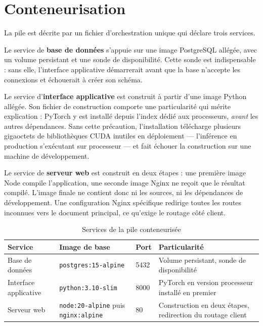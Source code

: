 \section{Conteneurisation}

La pile est décrite par un fichier d'orchestration unique qui déclare trois services.

Le service de \textbf{base de données} s'appuie sur une image PostgreSQL allégée, avec
un volume persistant et une sonde de disponibilité. Cette sonde est indispensable :
sans elle, l'interface applicative démarrerait avant que la base n'accepte les
connexions et échouerait à créer son schéma.

Le service d'\textbf{interface applicative} est construit à partir d'une image Python
allégée. Son fichier de construction comporte une particularité qui mérite explication :
PyTorch y est installé depuis l'index dédié aux processeurs, \emph{avant} les autres
dépendances. Sans cette précaution, l'installation télécharge plusieurs gigaoctets de
bibliothèques CUDA inutiles en déploiement — l'inférence en production s'exécutant sur
processeur — et fait échouer la construction sur une machine de développement.

Le service de \textbf{serveur web} est construit en deux étapes : une première image
Node compile l'application, une seconde image Nginx ne reçoit que le résultat compilé.
L'image finale ne contient donc ni les sources, ni les dépendances de développement.
Une configuration Nginx spécifique redirige toutes les routes inconnues vers le
document principal, ce qu'exige le routage côté client.

\begin{table}[H]
\centering
\caption{Services de la pile conteneurisée}
\label{tab:services}
\small
\begin{tabular}{@{}lllL{5.4cm}@{}}
\toprule
\textbf{Service} & \textbf{Image de base} & \textbf{Port} & \textbf{Particularité} \\
\midrule
Base de données & \texttt{postgres:15-alpine} & 5432 &
Volume persistant, sonde de disponibilité \\
\addlinespace[2pt]
Interface applicative & \texttt{python:3.10-slim} & 8000 &
PyTorch en version processeur installé en premier \\
\addlinespace[2pt]
Serveur web & \texttt{node:20-alpine} puis \texttt{nginx:alpine} & 80 &
Construction en deux étapes, redirection du routage client \\
\bottomrule
\end{tabular}
\end{table}

